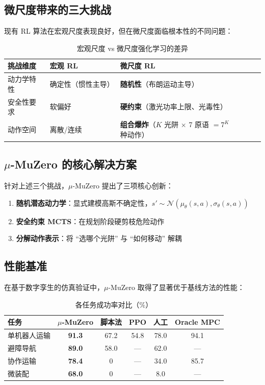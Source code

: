 \documentclass[UTF8, a4paper]{ctexart}
\begin{document}
\subsection{微尺度带来的三大挑战}

现有 RL 算法在宏观尺度表现良好，但在微尺度面临根本性的不同问题：

\begin{table}[H]
\centering
\caption{宏观尺度 vs 微尺度强化学习的差异}
\begin{tabular}{@{}lll@{}}
\toprule
\textbf{挑战维度} & \textbf{宏观 RL} & \textbf{微尺度 RL} \\
\midrule
动力学特性 & 确定性（惯性主导） & \textbf{随机性}（布朗运动主导） \\
安全性要求 & 软偏好 & \textbf{硬约束}（激光功率上限、光毒性） \\
动作空间 & 离散/连续 & \textbf{组合爆炸}（$K$ 光阱 $\times$ 7 原语 $= 7^K$ 种动作） \\
\bottomrule
\end{tabular}
\end{table}

\subsection{$\mu$-MuZero 的核心解决方案}

针对上述三个挑战，$\mu$-MuZero 提出了三项核心创新：

\begin{enumerate}[leftmargin=2em]
    \item \textbf{随机潜态动力学}：显式建模高斯不确定性，$s' \sim \mathcal{N}(\mu_\theta(s,a), \sigma_\theta(s,a))$
    \item \textbf{安全约束 MCTS}：在规划阶段硬剪枝危险动作
    \item \textbf{分解动作表示}：将 ``选哪个光阱'' 与 ``如何移动'' 解耦
\end{enumerate}

\subsection{性能基准}

在基于数字孪生的仿真验证中，$\mu$-MuZero 取得了显著优于基线方法的性能：

\begin{table}[H]
\centering
\caption{各任务成功率对比（\%）}
\begin{tabular}{@{}lccccc@{}}
\toprule
\textbf{任务} & \textbf{$\mu$-MuZero} & \textbf{脚本法} & \textbf{PPO} & \textbf{人工} & \textbf{Oracle MPC} \\
\midrule
单机器人运输 & \textbf{91.3} & 67.2 & 54.8 & 78.0 & 94.1 \\
避障导航 & \textbf{89.0} & 58.0 & --- & 62.0 & --- \\
协作运输 & \textbf{78.4} & 0 & --- & 34.0 & 85.7 \\
微装配 & \textbf{68.0} & 0 & --- & 8.0 & --- \\
\bottomrule
\end{tabular}
\end{table}
\end{document}
